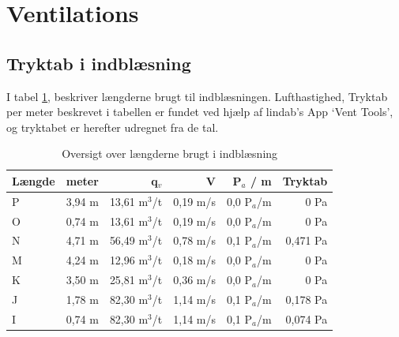 \section{Ventilations}

\subsection{Tryktab i indblæsning} \label{sub:tryktab_indblaesning}
I tabel \ref{table:oversigt_l_indblaesning}, beskriver længderne brugt til indblæsningen. 
Lufthastighed, Tryktab per meter beskrevet i tabellen er fundet ved hjælp af lindab's App `Vent Tools',
og tryktabet er herefter udregnet fra de tal.
\begin{table}[h!]
    \begin{center}
       \begin{tabular}{|l|r|r|r|r|r|}
           \hline
           Længde & meter & q$_{v}$ & V & P$_{a}$ / m & Tryktab\\
           \hline
            P & 3,94 m & 13,61 m$^3$/t & 0,19 m/s & 0,0 P$_{a}$/m & 0 Pa\\
            O & 0,74 m & 13,61 m$^3$/t & 0,19 m/s & 0,0 P$_{a}$/m & 0 Pa\\
            N & 4,71 m & 56,49 m$^3$/t & 0,78 m/s & 0,1 P$_{a}$/m & 0,471 Pa\\
            M & 4,24 m & 12,96 m$^3$/t & 0,18 m/s & 0,0 P$_{a}$/m & 0 Pa\\
            K & 3,50 m & 25,81 m$^3$/t & 0,36 m/s & 0,0 P$_{a}$/m & 0 Pa\\
            J & 1,78 m & 82,30 m$^3$/t & 1,14 m/s & 0,1 P$_{a}$/m & 0,178 Pa\\
            I & 0,74 m & 82,30 m$^3$/t & 1,14 m/s & 0,1 P$_{a}$/m & 0,074 Pa\\
           \hline
       \end{tabular}
   \end{center}
   \caption{Oversigt over længderne brugt i indblæsning}
   \label{table:oversigt_l_indblaesning}
\end{table}

